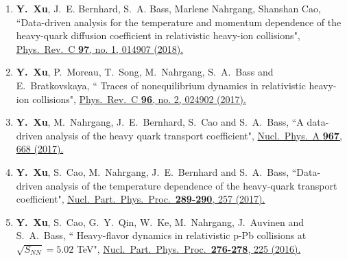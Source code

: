 

\begin{cventries}

\begin{enumerate}[wide, labelwidth=!, labelindent=0pt]
\item 
\cvpublication
{\textbf{Y.~Xu}, J.~E. Bernhard, S.~A. Bass, Marlene Nahrgang, Shanshan Cao, }
{``Data-driven analysis for the temperature and momentum dependence of the heavy-quark diffusion coefficient in relativistic heavy-ion collisions", } 
{\href{https://journals.aps.org/prc/pdf/10.1103/PhysRevC.97.014907}{Phys.\ Rev.\ C {\bf 97}, no. 1, 014907 (2018).}}


\item 
\cvpublication
{\textbf{Y.~Xu}, P.~Moreau, T.~Song, M.~Nahrgang, S.~A.~Bass and E.~Bratkovskaya, }
{`` Traces of nonequilibrium dynamics in relativistic heavy-ion collisions", } {\href{https://journals.aps.org/prc/abstract/10.1103/PhysRevC.96.024902}{Phys.\ Rev.\ C {\bf 96}, no. 2, 024902 (2017).}}

\item 
\cvpublication
{\textbf{Y.~Xu}, M.~Nahrgang, J.~E.~Bernhard, S.~Cao and S.~A.~Bass, }
{``A data-driven analysis of  the heavy quark transport coefficient", }
{\href{https://doi.org/10.1016/j.nuclphysa.2017.05.035}{Nucl.\ Phys.\ A {\bf 967}, 668 (2017).}}


\item 
\cvpublication
{\textbf{Y.~Xu}, S.~Cao, M.~Nahrgang, J.~E.~Bernhard and S.~A.~Bass, }
{``Data-driven analysis of the temperature dependence of the heavy-quark transport coefficient", }
{\href{https://doi.org/10.1016/j.nuclphysbps.2017.05.058}{Nucl.\ Part.\ Phys.\ Proc.\  {\bf 289-290}, 257 (2017).}}


\item 
\cvpublication
{\textbf{Y.~Xu}, S.~Cao, G.~Y.~Qin, W.~Ke, M.~Nahrgang, J.~Auvinen and S.~A.~Bass, }
{`` Heavy-flavor dynamics in relativistic p-Pb collisions at $\sqrt{S_{NN}}=5.02$ TeV", } {\href{https://doi.org/10.1016/j.nuclphysbps.2016.05.050}{Nucl.\ Part.\ Phys.\ Proc.\  {\bf 276-278}, 225 (2016).}}
\end{enumerate}

\end{cventries}
